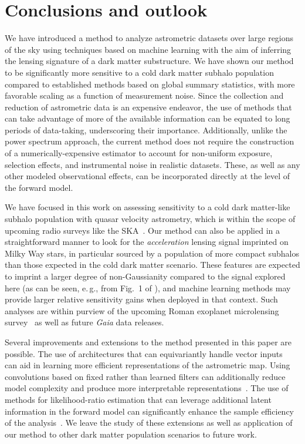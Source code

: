 \documentclass[twocolumn,linenumbers,anonymous]{aastex631}
\newcommand{\eg}{{e.\,g.}\xspace}
\begin{document}
\section{Conclusions and outlook}
\label{sec:conclusions}

We have introduced a method to analyze astrometric datasets over large regions of the sky using techniques based on machine learning with the aim of inferring the lensing signature of a dark matter substructure. We have shown our method to be significantly more sensitive to a cold dark matter subhalo population compared to established methods based on global summary statistics, with more favorable scaling as a function of measurement noise. Since the collection and reduction of astrometric data is an expensive endeavor, the use of methods that can take advantage of more of the available information can be equated to long periods of data-taking, underscoring their importance. Additionally, unlike the power spectrum approach, the current method does not require the construction of a numerically-expensive estimator to account for non-uniform exposure, selection effects, and instrumental noise in realistic datasets. These, as well as any other modeled observational effects, can be incorporated directly at the level of the forward model. 

We have focused in this work on assessing sensitivity to a cold dark matter-like subhalo population with quasar velocity astrometry, which is within the scope of upcoming radio surveys like the SKA~\citep{Fomalont:2004hr,Jarvis:2015tqa}. Our method can also be applied in a straightforward manner to look for the \emph{acceleration} lensing signal imprinted on Milky Way stars, in particular sourced by a population of more compact subhalos than those expected in the cold dark matter scenario. These features are expected to imprint a larger degree of non-Gaussianity compared to the signal explored here (as can be seen, \eg, from Fig.~1 of \citet{Mishra-Sharma:2020ynk}), and machine learning methods may provide larger relative sensitivity gains when deployed in that context. Such analyses are within purview of the upcoming Roman exoplanet microlensing survey~\citep{Pardo:2021uzy} as well as future \emph{Gaia} data releases.

Several improvements and extensions to the method presented in this paper are possible. The use of architectures that can equivariantly handle vector inputs~\citep{esteves2020spinweighted} can aid in learning more efficient representations of the astrometric map. Using convolutions based on fixed rather than learned filters can additionally reduce model complexity and produce more interpretable representations~\citep{Cheng:2020qbx,2021arXiv210709145H,2021arXiv210411244S,2021arXiv210202828M,Valogiannis:2021chp}. The use of methods for likelihood-ratio estimation that can leverage additional latent information in the forward model can significantly enhance the sample efficiency of the analysis~\citep{Brehmer:2018eca,Brehmer:2018hga,Brehmer:2018kdj,Stoye:2018ovl}. We leave the study of these extensions as well as application of our method to other dark matter population scenarios to future work.
\end{document}
